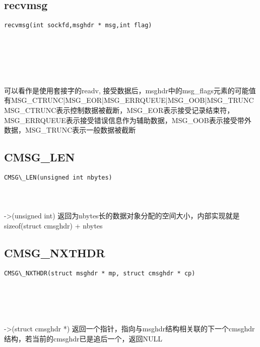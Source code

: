 \documentclass[10pt,a4paper]{article}
\begin{document}
\subsection{recvmsg}
\begin{spacing}{2.0}
\lstset{language=C,numbers=none}
\begin{lstlisting}
recvmsg(int sockfd,msghdr * msg,int flag)
\end{lstlisting}
{\large\color[rgb]{0.2,0.4,0.6}{sockfd:}} \\
{\large\color[rgb]{0.2,0.4,0.6}{msg:}} \\
{\large\color[rgb]{0.2,0.4,0.6}{flag:}}
\paragraph{ \ \ }可以看作是使用套接字的readv, 接受数据后，msghdr中的msg\_flags元素的可能值有MSG\_CTRUNC|MSG\_EOR|MSG\_ERRQUEUE|MSG\_OOB|MSG\_TRUNC MSG\_CTRUNC表示控制数据被截断，MSG\_EOR表示接受记录结束符，MSG\_ERRQUEUE表示接受错误信息作为辅助数据，MSG\_OOB表示接受带外数据，MSG\_TRUNC表示一般数据被截断
\end{spacing}

\subsection{CMSG\_LEN}
\begin{spacing}{2.0}
\lstset{language=C,numbers=none}
\begin{lstlisting}
CMSG\_LEN(unsigned int nbytes)
\end{lstlisting}
{\large\color[rgb]{0.2,0.4,0.6}{nbytes:}}
\paragraph{ \ \ }->(unsigned int) 返回为nbytes长的数据对象分配的空间大小，内部实现就是sizeof(struct cmsghdr) + nbytes
\end{spacing}

\subsection{CMSG\_NXTHDR}
\begin{spacing}{2.0}
\lstset{language=C,numbers=none}
\begin{lstlisting}
CMSG\_NXTHDR(struct msghdr * mp, struct cmsghdr * cp)
\end{lstlisting}
{\large\color[rgb]{0.2,0.4,0.6}{mp:}} \\
{\large\color[rgb]{0.2,0.4,0.6}{cp:}}
\paragraph{ \ \ }->(struct cmsghdr *) 返回一个指针，指向与msghdr结构相关联的下一个cmsghdr结构，若当前的cmsghdr已是追后一个，返回NULL
\end{spacing}
\end{document}
